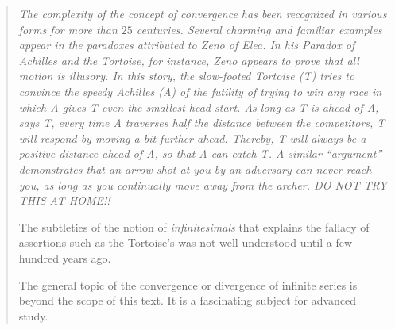 \begin{quote}
{\em
The complexity of the concept of convergence has been recognized in
various forms for more than $25$ centuries.  Several charming and
familiar examples appear in the paradoxes attributed to Zeno of Elea.
In his {\it Paradox of Achilles and the Tortoise}, for instance, Zeno
appears to prove that all motion is illusory.  In this story, the
slow-footed Tortoise (T) tries to convince the speedy Achilles (A) of
the futility of trying to win any race in which A gives T even the
smallest head start.  As long as T is ahead of A, says T, every time A
traverses half the distance between the competitors, T will respond by
moving a bit further ahead.  Thereby, T will always be a positive
distance ahead of A, so that A can catch T.  A similar ``argument''
demonstrates that an arrow shot at you by an adversary can never reach
you, as long as you continually move away from the archer.  {\em DO
  NOT TRY THIS AT HOME!!}

The subtleties of the notion of {\em infinitesimals} that explains the
fallacy of assertions such as the Tortoise's was not well understood
until a few hundred years ago.

The general topic of the convergence or divergence of infinite series
is beyond the scope of this text.  It is a fascinating subject for
advanced study.
}
\end{quote}


